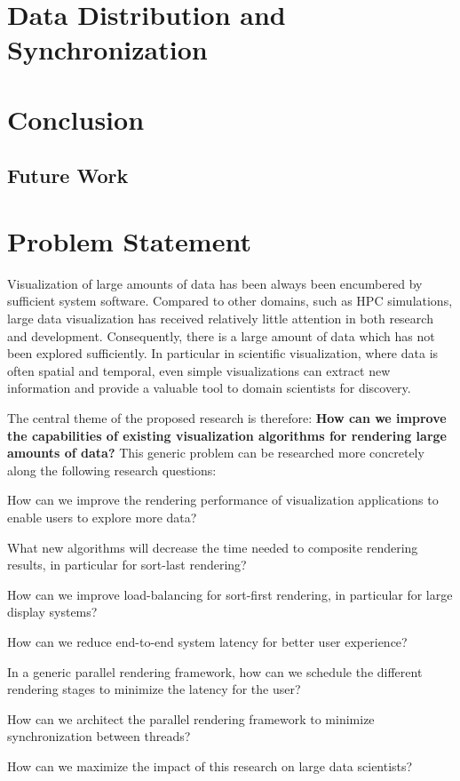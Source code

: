 \chapter{Data Distribution and Synchronization}


\chapter{Conclusion}

\section{Future Work}



\chapter{Problem Statement}

Visualization of large amounts of data has been always been encumbered by
sufficient system software. Compared to other domains, such as HPC simulations,
large data visualization has received relatively little attention in both
research and development. Consequently, there is a large amount of data which
has not been explored sufficiently. In particular in scientific visualization,
where data is often spatial and temporal, even simple visualizations can extract
new information and provide a valuable tool to domain scientists for discovery.

The central theme of the proposed research is therefore: {\bf How can we improve
the capabilities of existing visualization algorithms for rendering large
amounts of data?} This generic problem can be researched more concretely along
the following research questions:
\begin{compactenum}
\item How can we improve the rendering performance of visualization applications to enable users to explore more data?
    \begin{compactenum}
    \item What new algorithms will decrease the time needed to composite rendering results, in particular for sort-last rendering?
    \item How can we improve load-balancing for sort-first rendering, in particular for large display systems?
    \end{compactenum}
\item How can we reduce end-to-end system latency for better user experience?
    \begin{compactenum}
    \item In a generic parallel rendering framework, how can we schedule the different rendering stages to minimize the latency for the user?
    \item How can we architect the parallel rendering framework to minimize synchronization between threads?
    \end{compactenum}
\item How can we maximize the impact of this research on large data scientists?
\end{compactenum}

